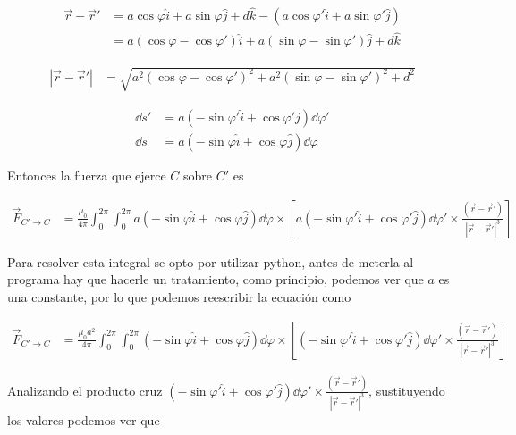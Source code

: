 \documentclass[11pt]{report}
\theoremstyle{plain}
\theoremstyle{definition}
\begin{document}
	\begin{align*}%
		\vec{r} - \vec{r}' &= a\cos\varphi\hat{i} + a\sin\varphi\hat{j}+d\hat{k} - (a\cos\varphi'\hat{i} + a\sin\varphi'\hat{j})\\
		&= a(\cos\varphi-\cos\varphi')\hat{i} + a(\sin\varphi-\sin\varphi')\hat{j} + d\hat{k}
	\end{align*}
	
	\begin{align*}%
		|\vec{r} - \vec{r}'| &= \sqrt{a^2(\cos\varphi-\cos\varphi')^2 + a^2(\sin\varphi-\sin\varphi')^2 + d^2}
	\end{align*}
	
	\begin{align*}%
		\dd{s'} &= a \left(-\sin\varphi'\hat{i} + \cos\varphi'\hat{j}\right)\dd{\varphi'}\\
		\dd{s} &= a \left(-\sin\varphi\hat{i} + \cos\varphi\hat{j}\right)\dd{\varphi}
	\end{align*}
	
	Entonces la fuerza que ejerce $C$ sobre $C'$ es

	\begin{align*}%
		\vec{F}_{C'\rightarrow C}&= \frac{\mu_0}{4\pi}\int_0^{2\pi}\int_0^{2\pi} a \left(-\sin\varphi\hat{i} + \cos\varphi\hat{j}\right)\dd{\varphi} \times \left[ a \left(-\sin\varphi'\hat{i} + \cos\varphi'\hat{j}\right)\dd{\varphi'} \times \frac{(\vec{r} - \vec{r}')}{|\vec{r} - \vec{r}'|^3}\right]
	\end{align*}
	
	
	Para resolver esta integral se opto por utilizar python, antes de meterla al programa hay que hacerle un tratamiento, como principio, podemos ver que $a$ es una constante, por lo que podemos reescribir la ecuación como
	
	\begin{align*}%
		\vec{F}_{C'\rightarrow C}&= \frac{\mu_0a^2}{4\pi}\int_0^{2\pi}\int_0^{2\pi}\left(-\sin\varphi\hat{i} + \cos\varphi\hat{j}\right)\dd{\varphi} \times \left[  \left(-\sin\varphi'\hat{i} + \cos\varphi'\hat{j}\right)\dd{\varphi'} \times \frac{(\vec{r} - \vec{r}')}{|\vec{r} - \vec{r}'|^3}\right]
	\end{align*}

	Analizando el producto cruz $\left(-\sin\varphi'\hat{i} + \cos\varphi'\hat{j}\right)\dd{\varphi'} \times \frac{(\vec{r} - \vec{r}')}{|\vec{r} - \vec{r}'|^3}$, sustituyendo los valores podemos ver que
	
\end{document}
